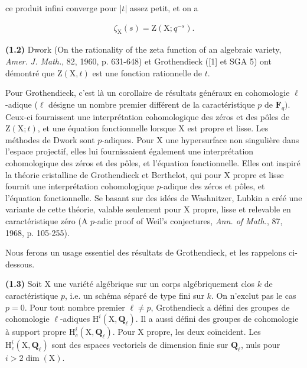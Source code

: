 \documentclass[10pt,leqno]{article}
\begin{document}
\noindent ce produit infini converge pour |\(t|\) assez petit, et on a\par

\begin{equation*}\begin{gathered}\zeta _{\mathrm{X}}(s) = \mathrm{Z}(\mathrm{X}; q^{- s}).\end{gathered}\tag{1.1.3}\end{equation*}

\noindent \textbf{(1.2)} Dwork (On the rationality of the zeta function of an algebraic variety, \emph{Amer. J. Math.}, 82, 1960, p. 631-648) et Grothendieck ([1] et SGA 5) ont démontré que \(\mathrm{Z}(\mathrm{X}, t)\) est une fonction rationnelle de \(t\).\par

\noindent Pour Grothendieck, c’est là un corollaire de résultats généraux en cohomologie \(\ell \)-adique (\(\ell \) désigne un nombre premier différent de la caractéristique \(p\) de \(\mathbf{F}_{q})\). Ceux-ci fournissent une interprétation cohomologique des zéros et des pôles de \(\mathrm{Z}(\mathrm{X}; t)\), et une équation fonctionnelle lorsque \(\mathrm{X}\) est propre et lisse. Les méthodes de Dwork sont \(p\)-adiques. Pour \(\mathrm{X}\) une hypersurface non singulière dans l’espace projectif, elles lui fournissaient également une interprétation cohomologique des zéros et des pôles, et l’équation fonctionnelle. Elles ont inspiré la théorie cristalline de Grothendieck et Berthelot, qui pour \(\mathrm{X}\) propre et lisse fournit une interprétation cohomologique \(p\)-adique des zéros et pôles, et l’équation fonctionnelle. Se basant sur des idées de Washnitzer, Lubkin a créé une variante de cette théorie, valable seulement pour \(\mathrm{X}\) propre, lisse et relevable en caractéristique zéro (A \(p\)-adic proof of Weil’s conjectures, \emph{Ann. of Math.}, 87, 1968, p. 105-255).\par

\noindent Nous ferons un usage essentiel des résultats de Grothendieck, et les rappelons ci-dessous.\par

\noindent \textbf{(1.3)} Soit \(\mathrm{X}\) une variété algébrique sur un corps algébriquement clos \(k\) de caractéristique \(p\), i.e. un schéma séparé de type fini sur \(k\). On n’exclut pas le cas \(p=0\). Pour tout nombre premier \(\ell \ne p\), Grothendieck a défini des groupes de cohomologie \(\ell \)-adiques \(\mathrm{H}^{i}(\mathrm{X}, \mathbf{Q}_{\ell })\). Il a aussi défini des groupes de cohomologie à support propre \(\mathrm{H}_{c}^{i}(\mathrm{X}, \mathbf{Q}_{\ell })\). Pour \(\mathrm{X}\) propre, les deux coïncident. Les \(\mathrm{H}_{c}^{i}(\mathrm{X}, \mathbf{Q}_{\ell })\) sont des espaces vectoriels de dimension finie sur \(\mathbf{Q}_{\ell }\), nuls pour \(i>2 \operatorname{dim}(\mathrm{X})\).\par
\end{document}
